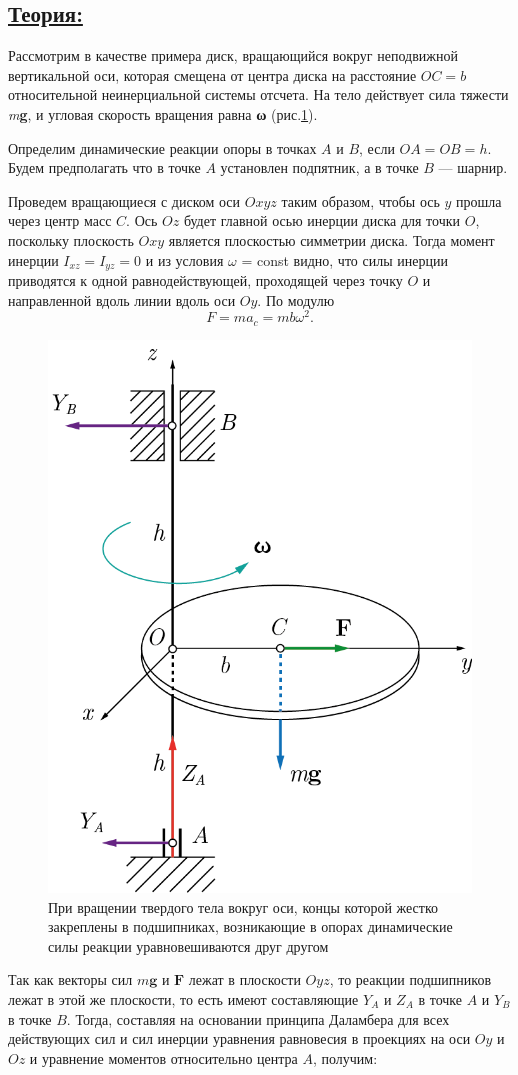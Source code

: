\documentclass[14pt,a4paper,oneside]{extarticle}	%
\begin{document}
\subsection*{\underline{Теория:}}

Рассмотрим в качестве примера диск, вращающийся вокруг неподвижной вертикальной оси, которая смещена от центра диска на расстояние $ OC=b $ относительной неинерциальной системы отсчета. 
На тело действует сила тяжести \textit{m}\textbf{g}, и угловая скорость вращения равна \textbf{ω} (рис.\ref{freeaxis-5}).

Определим динамические реакции опоры в точках $ A $ и $ B $, если $ OA = OB = h $.
Будем предполагать что в точке $ A $ установлен подпятник, а в точке $ B $ — шарнир.

Проведем вращающиеся с диском оси $ Oxyz $ таким образом, чтобы ось $ y $ прошла через центр масс $ C $.
Ось $ Oz $ будет главной осью инерции диска для точки $ O $, поскольку плоскость $ Oxy $ является плоскостью симметрии диска.
Тогда момент инерции $ I_{xz} = I_{yz} = 0 $ и из условия $ \omega $ = const видно, что силы инерции приводятся к одной равнодействующей, проходящей через точку $ O $ и направленной вдоль линии вдоль оси $Oy$.
По модулю $$ F = ma_{c} = mb\omega^{2}. $$

\begin{figure}[H] 	
	\centering 		
	\includegraphics[width=0.5\linewidth]{freeaxis-5.png}
	\caption{При вращении твердого тела вокруг оси, концы которой жестко закреплены в подшипниках, возникающие в опорах динамические силы реакции уравновешиваются друг другом}
	\label{freeaxis-5}
\end{figure}

Так как векторы сил $ m\textbf{g} $ и $ \textbf{F} $ лежат в плоскости $ Oyz $, то реакции подшипников лежат в этой же плоскости, то есть имеют составляющие $ Y_{A} $ и $ Z_{A} $ в точке $ A $ и $ Y_{B} $ в точке $ B $. 
Тогда, составляя на основании принципа Даламбера для всех действующих сил и сил инерции уравнения равновесия в проекциях на оси $ Oy $ и $ Oz $ и уравнение моментов относительно центра $ A $, получим:
\end{document}
